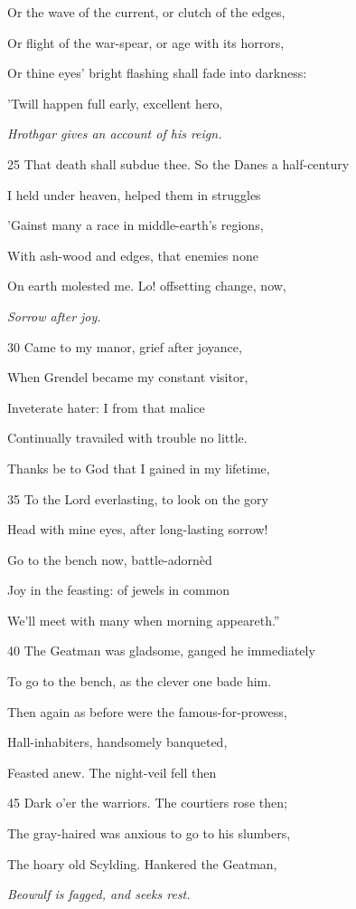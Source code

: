 Or the wave of the current, or clutch of the edges,

Or flight of the war-spear, or age with its horrors,

Or thine eyes’ bright flashing shall fade into darkness:

’Twill happen full early, excellent hero,

\emph{Hrothgar gives an
account of his
reign.}

25
That death shall subdue thee. So the Danes a half-century

I held under heaven, helped them in struggles

’Gainst many a race in middle-earth’s regions,

With ash-wood and edges, that enemies none

On earth molested me. Lo! offsetting change, now,

\emph{Sorrow after joy.}

30
Came to my manor, grief after joyance,

When Grendel became my constant visitor,

Inveterate hater: I from that malice

Continually travailed with trouble no little.

Thanks be to God that I gained in my lifetime,

35
To the Lord everlasting, to look on the gory

Head with mine eyes, after long-lasting sorrow!

Go to the bench now, battle-adornèd

Joy in the feasting: of jewels in common

We’ll meet with many when morning appeareth.”

40
The Geatman was gladsome, ganged he immediately

To go to the bench, as the clever one bade him.

Then again as before were the famous-for-prowess,

Hall-inhabiters, handsomely banqueted,

Feasted anew. The night-veil fell then

45
Dark o’er the warriors. The courtiers rose then;

The gray-haired was anxious to go to his slumbers,

The hoary old Scylding. Hankered the Geatman,

\emph{Beowulf is fagged,
and seeks rest.}

